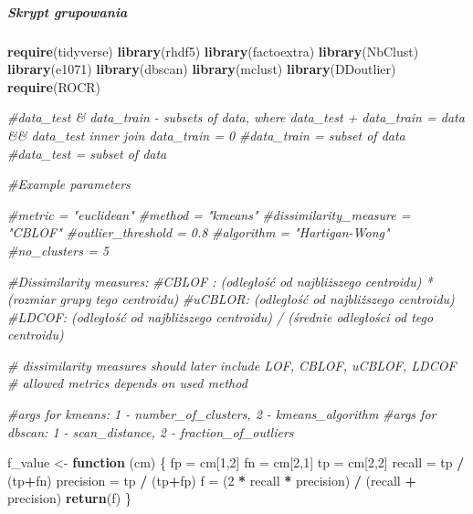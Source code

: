\documentclass[
]{article}
\newenvironment{Shaded}{\begin{snugshade}}{\end{snugshade}}
\newcommand{\CommentTok}[1]{\textcolor[rgb]{0.56,0.35,0.01}{\textit{#1}}}
\newcommand{\ControlFlowTok}[1]{\textcolor[rgb]{0.13,0.29,0.53}{\textbf{#1}}}
\newcommand{\DecValTok}[1]{\textcolor[rgb]{0.00,0.00,0.81}{#1}}
\newcommand{\KeywordTok}[1]{\textcolor[rgb]{0.13,0.29,0.53}{\textbf{#1}}}
\newcommand{\NormalTok}[1]{#1}
\newcommand{\OperatorTok}[1]{\textcolor[rgb]{0.81,0.36,0.00}{\textbf{#1}}}
\newcommand{\StringTok}[1]{\textcolor[rgb]{0.31,0.60,0.02}{#1}}
\begin{document}
\hypertarget{skrypt-grupowania}{%
\subparagraph{Skrypt grupowania}\label{skrypt-grupowania}}

\begin{Shaded}
\begin{Highlighting}[]
\KeywordTok{require}\NormalTok{(tidyverse)}
\KeywordTok{library}\NormalTok{(rhdf5)}
\KeywordTok{library}\NormalTok{(factoextra)}
\KeywordTok{library}\NormalTok{(NbClust)}
\KeywordTok{library}\NormalTok{(e1071)}
\KeywordTok{library}\NormalTok{(dbscan)}
\KeywordTok{library}\NormalTok{(mclust)}
\KeywordTok{library}\NormalTok{(DDoutlier)}
\KeywordTok{require}\NormalTok{(ROCR)}

\CommentTok{#data_test & data_train - subsets of data, where data_test + data_train = data && data_test inner join data_train = 0}
\CommentTok{#data_train = subset of data}
\CommentTok{#data_test = subset of data}

\CommentTok{#Example parameters}

\CommentTok{#metric = "euclidean"}
\CommentTok{#method = "kmeans"}
\CommentTok{#dissimilarity_measure = "CBLOF"}
\CommentTok{#outlier_threshold = 0.8}
\CommentTok{#algorithm = "Hartigan-Wong"}
\CommentTok{#no_clusters = 5}

\CommentTok{#Dissimilarity measures:}
\CommentTok{#CBLOF : (odległość od najbliższego centroidu) * (rozmiar grupy tego centroidu)}
\CommentTok{#uCBLOR: (odległość od najbliższego centroidu)}
\CommentTok{#LDCOF: (odległość od najbliższego centroidu) / (średnie odległości od tego centroidu)}

\CommentTok{# dissimilarity measures should later include LOF, CBLOF, uCBLOF, LDCOF}
\CommentTok{# allowed metrics depends on used method}

\CommentTok{#args for kmeans: 1 - number_of_clusters, 2 - kmeans_algorithm}
\CommentTok{#args for dbscan: 1 - scan_distance, 2 - fraction_of_outliers}


\NormalTok{f_value <-}\StringTok{ }\ControlFlowTok{function}\NormalTok{ (cm) \{}
\NormalTok{  fp =}\StringTok{ }\NormalTok{cm[}\DecValTok{1}\NormalTok{,}\DecValTok{2}\NormalTok{]}
\NormalTok{  fn =}\StringTok{ }\NormalTok{cm[}\DecValTok{2}\NormalTok{,}\DecValTok{1}\NormalTok{]}
\NormalTok{  tp =}\StringTok{ }\NormalTok{cm[}\DecValTok{2}\NormalTok{,}\DecValTok{2}\NormalTok{]}
\NormalTok{  recall =}\StringTok{ }\NormalTok{tp }\OperatorTok{/}\StringTok{ }\NormalTok{(tp}\OperatorTok{+}\NormalTok{fn)}
\NormalTok{  precision =}\StringTok{ }\NormalTok{tp }\OperatorTok{/}\StringTok{ }\NormalTok{(tp}\OperatorTok{+}\NormalTok{fp)}
\NormalTok{  f =}\StringTok{ }\NormalTok{(}\DecValTok{2} \OperatorTok{*}\StringTok{ }\NormalTok{recall }\OperatorTok{*}\StringTok{ }\NormalTok{precision) }\OperatorTok{/}\StringTok{ }\NormalTok{(recall }\OperatorTok{+}\StringTok{ }\NormalTok{precision)}
  \KeywordTok{return}\NormalTok{(f)}
\NormalTok{\}}



\end{Highlighting}
\end{Shaded}
\end{document}
